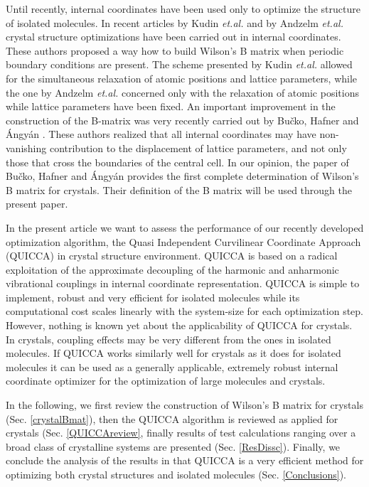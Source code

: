 \documentclass[prl,aps,preprint,superbib,12pt]{revtex4}
\begin{document}
Until recently, internal coordinates have been used only to optimize
the structure of isolated molecules.
In recent articles by Kudin {\it et.al.} \cite{KKudin01} and by
Andzelm {\it et.al.} \cite{JAndzelm01} crystal structure optimizations
have been carried out in internal coordinates.
These authors proposed a way
how to build Wilson's B matrix \cite{EWilson55} 
when periodic boundary conditions are present. 
The scheme presented by Kudin {\it et.al.} \cite{KKudin01} allowed for 
the simultaneous relaxation of atomic positions and lattice parameters,
while the one by Andzelm {\it et.al.} \cite{JAndzelm01}  concerned only 
with the relaxation of atomic positions while lattice parameters have 
been fixed. 
An important improvement in the construction of the B-matrix
was very recently carried out by Bu\v{c}ko, Hafner and {\'A}ngy{\'a}n
\cite{TBucko05}.
These authors realized that 
all internal coordinates may have non-vanishing contribution
to the displacement of lattice parameters, and not only those
that cross the boundaries of the central cell. 
In our opinion, the paper of Bu\v{c}ko, Hafner and {\'A}ngy{\'a}n
provides the first complete determination of Wilson's B matrix
for crystals. Their definition of the B matrix will be used through
the present paper. 

In the present article we want to assess the performance of our recently
developed optimization algorithm, the Quasi Independent Curvilinear 
Coordinate Approach (QUICCA) \cite{KNemeth04} 
in crystal structure environment.
QUICCA is based on a radical exploitation of the approximate decoupling
of the harmonic and anharmonic vibrational couplings in
internal coordinate representation.
QUICCA is simple 
to implement, robust and very efficient for isolated molecules while
its computational cost scales linearly with the system-size for each 
optimization step. However, nothing is known yet about the 
applicability of QUICCA for crystals. In crystals, coupling effects
may be very different from the ones in isolated molecules. If QUICCA
works similarly well for crystals as it does for isolated molecules
it can be used as a generally applicable, extremely robust 
internal coordinate optimizer for the optimization of large 
molecules and crystals. 

In the following, we first review the construction of Wilson's B matrix
for crystals (Sec. \ref{crystalBmat}), then the QUICCA algorithm is 
reviewed as applied for crystals (Sec. \ref{QUICCAreview}, 
finally results of test calculations
ranging over a broad class of crystalline systems are presented
(Sec. \ref{ResDissc}). Finally, we conclude the analysis of the results
in that QUICCA is a very efficient method for optimizing both
crystal structures and isolated molecules (Sec. \ref{Conclusions}).
\end{document}
